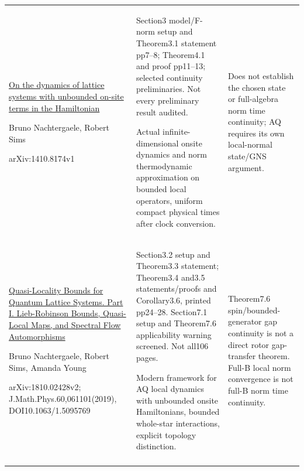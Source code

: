 \begin{longtable}{@{}p{46mm}p{60mm}p{46mm}@{}}
\href{https://arxiv.org/abs/1410.8174v1}{On the dynamics of lattice systems with unbounded on-site terms in the Hamiltonian}\par Bruno Nachtergaele, Robert Sims\par arXiv:1410.8174v1 & Section3 model/F-norm setup and Theorem3.1 statement pp7--8; Theorem4.1 and proof pp11--13; selected continuity preliminaries. Not every preliminary result audited.\par Actual infinite-dimensional onsite dynamics and norm thermodynamic approximation on bounded local operators, uniform compact physical times after clock conversion. & Does not establish the chosen state or full-algebra norm time continuity; AQ requires its own local-normal state/GNS argument.\\\addlinespace
\href{https://arxiv.org/abs/1810.02428v2}{Quasi-Locality Bounds for Quantum Lattice Systems. Part I. Lieb-Robinson Bounds, Quasi-Local Maps, and Spectral Flow Automorphisms}\par Bruno Nachtergaele, Robert Sims, Amanda Young\par arXiv:1810.02428v2; J.Math.Phys.60,061101(2019), DOI10.1063/1.5095769 & Section3.2 setup and Theorem3.3 statement; Theorem3.4 and3.5 statements/proofs and Corollary3.6, printed pp24--28. Section7.1 setup and Theorem7.6 applicability warning screened. Not all106 pages.\par Modern framework for AQ local dynamics with unbounded onsite Hamiltonians, bounded whole-star interactions, explicit topology distinction. & Theorem7.6 spin/bounded-generator gap continuity is not a direct rotor gap-transfer theorem. Full-B local norm convergence is not full-B norm time continuity.\\\addlinespace
\bottomrule\end{longtable}\endgroup
